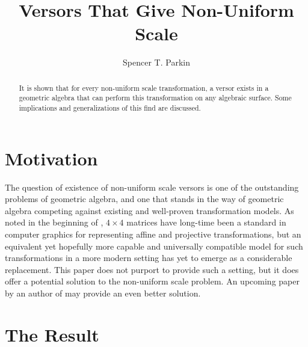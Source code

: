 \documentclass{birkjour}
\theoremstyle{definition}
\theoremstyle{remark}
\numberwithin{equation}{section}
\begin{document}
\title{Versors That Give Non-Uniform Scale}

\author{Spencer T. Parkin}
\address{102 W. 500 S., \\
Salt Lake City, UT  84101} 



\begin{abstract}
It is shown that for every non-uniform scale transformation, a versor
exists in a geometric algebra that can perform this transformation
on any algebraic surface.  Some implications and generalizations of this find are discussed.
\end{abstract}


\maketitle

\section{Motivation}

The question of existence of non-uniform scale versors is one of the outstanding problems of geometric algebra,
and one that stands in the way of geometric algebra competing against existing and well-proven transformation models.
As noted in the beginning of \cite{Goldman}, $4\times 4$ matrices have long-time been a standard
in computer graphics for representing affine and projective transformations, but an
equivalent yet hopefully more capable and universally compatible model for such transformations in a more modern setting has yet to emerge
as a considerable replacement.  This paper does not purport to provide such a setting,
but it does offer a potential solution to the non-uniform scale problem.
An upcoming paper by an author of \cite{Dorst07} may provide an even better solution.

\section{The Result}
\end{document}
